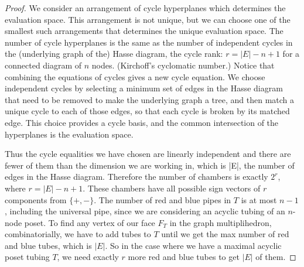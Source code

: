 \documentclass{article}
\begin{document}
   \begin{proof}
       We consider an arrangement of cycle hyperplanes which determines the evaluation space. This arrangement is not unique, but we can choose one of the smallest such arrangements that determines the unique evaluation space.  
       The number of cycle hyperplanes is the same as the number of independent cycles in the (underlying graph of the) Hasse diagram, the cycle rank: $r = |E| - n +1$ for a connected diagram of $n$ nodes. (Kirchoff's cyclomatic number.) Notice that combining the equations of cycles gives a new cycle equation. We choose independent cycles by selecting a minimum set of edges in the Hasse diagram that need to be removed to make the underlying graph a tree, and then match a unique cycle to each of those edges, so that each cycle is broken by its matched edge. This choice provides a cycle basis, and the common intersection of the hyperplanes is the evaluation space. %


 
Thus the cycle equalities we have chosen are linearly independent and there are fewer of them than the dimension we are working in, which is |E|, the number of edges in the Hasse diagram. Therefore the number of chambers is exactly $2^r$,  where $r =|E|-n+1$.  These chambers have all possible sign vectors of $r$ components from $\{+,-\}$. 
The number of red and blue pipes in $T$ is at most $n-1$, including the universal pipe, since we are considering an acyclic tubing of an $n$-node poset. To find any vertex of our face $F_T$ in the graph multiplihedron, combinatorially, we have to add tubes to $T$ until we get the max number of red and blue tubes, which is $|E|$. 
So in the case where we have a maximal acyclic poset tubing $T$, we need exactly $r$ more red and blue tubes to get $|E|$ of them. 


\end{proof}
\end{document}
